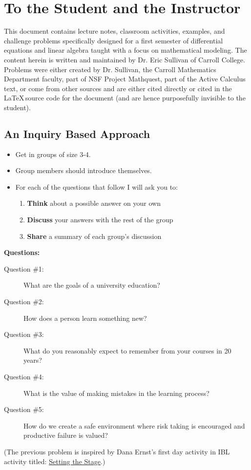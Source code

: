 \setcounter{chapter}{-1}
\chapter{To the Student and the Instructor}
This document contains lecture notes, classroom activities, examples, and challenge
problems specifically designed for a first semester of differential equations and linear
algebra taught with a focus on mathematical modeling. The content herein is written and
maintained by Dr. Eric Sullivan of Carroll College.  Problems were either created by Dr.
Sullivan, the Carroll Mathematics Department faculty, part of NSF Project Mathquest, part
of the Active Calculus text, or come from other sources and are either cited directly or
cited in the \LaTeX\,source code for the document (and are hence purposefully invisible to
the student).


\section{An Inquiry Based Approach}
\begin{problem}
    \begin{itemize}
        \item Get in groups of size 3-4.
        \item Group members should introduce themselves.
        \item For each of the questions that follow I will ask you to:
            \begin{enumerate}
                \item {\bf Think} about a possible answer on your own
                \item {\bf Discuss} your answers with the rest of the group
                \item {\bf Share} a summary of each group's discussion
            \end{enumerate}
    \end{itemize}
    {\bf Questions:} 
    \begin{description}
        \item[Question \#1:] What are the goals of a university education?
        \item[Question \#2:] How does a person learn something new?
        \item[Question \#3:] What do you reasonably expect to remember from your courses
            in 20 years?
        \item[Question \#4:] What is the value of making mistakes in the learning process?
        \item[Question \#5:] How do we create a safe environment where risk taking is
            encouraged and productive failure is valued?
    \end{description}
\end{problem}
(The previous problem is inspired by Dana Ernst's first day activity in IBL activity
titled: 
\href{http://danaernst.com/setting-the-stage/}{Setting the Stage}.)

